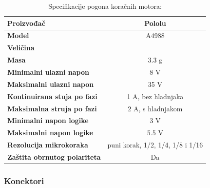 \documentclass[11pt,a4paper]{article}
\begin{document}
\begin{table}[H]
	\centering
	\caption{Specifikacije pogona koračnih motora: }
	\label{tab:specifikacija_stepper_driver}
	\begin{tabular}{|l|c|}
		\hline
		\textbf{Proizvođač} & Pololu \\ \hline 
		\textbf{Model} & A4988 \\ \hline 
		\textbf{Veličina} &    \\ \hline 
		\textbf{Masa} & 3.3 g \\ \hline 
		\textbf{Minimalni ulazni napon} & 8 V \\ \hline 
		\textbf{Maksimalni ulazni napon} & 35 V \\ \hline 
		\textbf{Kontinuirana stuja po fazi} & 1 A, bez hladnjaka \\ \hline 
		\textbf{Maksimalna struja po fazi} & 2 A, s hladnjakom \\ \hline 
		\textbf{Minimalni napon logike} & 3 V\\ \hline 
		\textbf{Maksimalni napon logike} & 5.5 V\\ \hline 
		\textbf{Rezolucija mikrokoraka} & puni korak, 1/2, 1/4, 1/8 i 1/16\\ \hline 
		\textbf{Zaštita obrnutog polariteta} & Da\\ \hline 
	\end{tabular}
\end{table}


\subsubsection{Konektori}
\end{document}
